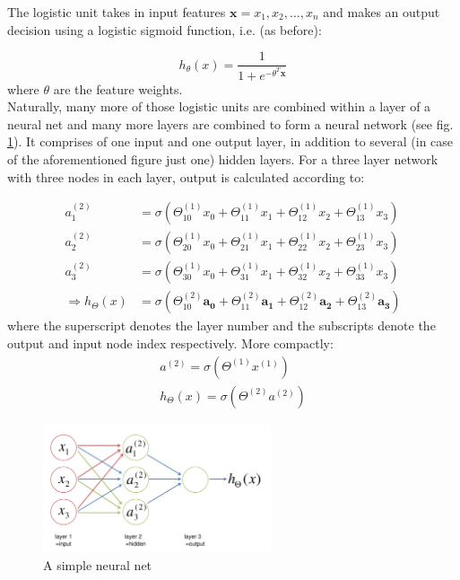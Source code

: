 \documentclass[a4paper, 12pt]{article}
\numberwithin{equation}{section}
\begin{document}
	The logistic unit takes in input features $\boldsymbol{x}=x_1, x_2, ..., x_n$ and makes an output decision using a logistic sigmoid function, i.e. (as before):

	\begin{equation}
	h_\theta (x) = \frac{1}{1+e^{-\theta ^ T \boldsymbol{x}}}
	\end{equation}
	where $\theta$ are the feature weights.\\

	Naturally, many more of those logistic units are combined within a layer of a neural net and many more layers are combined to form a neural network (see fig. \ref{fig:neural_net}). It comprises of one input and one output layer, in addition to several (in case of the aforementioned figure just one) hidden layers. For a three layer network with three nodes in each layer, output is calculated according to:

	\begin{align}
	a_1^{(2)} &= \sigma (\Theta_{10}^{(1)} x_0 + \Theta_{11}^{(1)} x_1  + \Theta_{12}^{(1)} x_2  + \Theta_{13}^{(1)} x_3) \\
	a_2^{(2)} &= \sigma (\Theta_{20}^{(1)} x_0 + \Theta_{21}^{(1)} x_1  + \Theta_{22}^{(1)} x_2  + \Theta_{23}^{(1)} x_3) \\
	a_3^{(2)} &= \sigma (\Theta_{30}^{(1)} x_0 + \Theta_{31}^{(1)} x_1  + \Theta_{32}^{(1)} x_2  + \Theta_{33}^{(1)} x_3) \\
	\Rightarrow h_{\Theta} (x) &= \sigma (\Theta_{10}^{(2)} \boldsymbol{a_0} + \Theta_{11}^{(2)} \boldsymbol{a_1}  + \Theta_{12}^{(2)} \boldsymbol{a_2}  + \Theta_{13}^{(2)} \boldsymbol{a_3})
	\end{align}
	where the superscript denotes the layer number and the subscripts denote the output and input node index respectively. More compactly:
	\begin{align}
	a^{(2)} = \sigma(\Theta^{(1)} x^{(1)}) \\
	h_{\Theta}(x) = \sigma(\Theta^{(2)} a^{(2)})
	\end{align}

	\begin{figure}[!h]
		\centering
		\includegraphics[page=1,width=0.60\textwidth]{neural_net.pdf}
		\caption{\label{fig:neural_net}{A simple neural net}}
	\end{figure}
\end{document}
